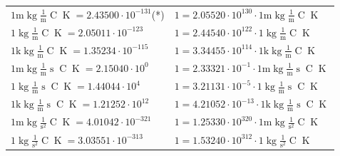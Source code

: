 \begin{center}
\begin{longtable}{l l}
{\color{gray}$1 \bm{\mathrm{ m}}\operatorname{kg}\frac1{\operatorname{m}}{}{\operatorname{C}}{\operatorname{K}} = 2.43500\cdot10^{-131} $}\quad(*) & {\color{gray}$ 1 = 2.05520\cdot10^{130} \cdot 1 \bm{\mathrm{ m}}\operatorname{kg}\frac1{\operatorname{m}}{}{\operatorname{C}}{\operatorname{K}}$}  \\
{\color{black}$1 \bm{\mathrm{ }}\operatorname{kg}\frac1{\operatorname{m}}{}{\operatorname{C}}{\operatorname{K}} = 2.05011\cdot10^{-123} $}   & {\color{black}$ 1 = 2.44540\cdot10^{122} \cdot 1 \bm{\mathrm{ }}\operatorname{kg}\frac1{\operatorname{m}}{}{\operatorname{C}}{\operatorname{K}}$}  \\
{\color{gray}$1 \bm{\mathrm{ k}}\operatorname{kg}\frac1{\operatorname{m}}{}{\operatorname{C}}{\operatorname{K}} = 1.35234\cdot10^{-115} $}   & {\color{gray}$ 1 = 3.34455\cdot10^{114} \cdot 1 \bm{\mathrm{ k}}\operatorname{kg}\frac1{\operatorname{m}}{}{\operatorname{C}}{\operatorname{K}}$}  \\
{\color{gray}$1 \bm{\mathrm{ m}}\operatorname{kg}\frac1{\operatorname{m}}{\operatorname{s}}{\operatorname{C}}{\operatorname{K}} = 2.15040\cdot10^{0} $}   & {\color{gray}$ 1 = 2.33321\cdot10^{-1} \cdot 1 \bm{\mathrm{ m}}\operatorname{kg}\frac1{\operatorname{m}}{\operatorname{s}}{\operatorname{C}}{\operatorname{K}}$}  \\
{\color{black}$1 \bm{\mathrm{ }}\operatorname{kg}\frac1{\operatorname{m}}{\operatorname{s}}{\operatorname{C}}{\operatorname{K}} = 1.44044\cdot10^{4} $}   & {\color{black}$ 1 = 3.21131\cdot10^{-5} \cdot 1 \bm{\mathrm{ }}\operatorname{kg}\frac1{\operatorname{m}}{\operatorname{s}}{\operatorname{C}}{\operatorname{K}}$}  \\
{\color{gray}$1 \bm{\mathrm{ k}}\operatorname{kg}\frac1{\operatorname{m}}{\operatorname{s}}{\operatorname{C}}{\operatorname{K}} = 1.21252\cdot10^{12} $}   & {\color{gray}$ 1 = 4.21052\cdot10^{-13} \cdot 1 \bm{\mathrm{ k}}\operatorname{kg}\frac1{\operatorname{m}}{\operatorname{s}}{\operatorname{C}}{\operatorname{K}}$}  \\
{\color{gray}$1 \bm{\mathrm{ m}}\operatorname{kg}{}\frac1{\operatorname{s}^2}{\operatorname{C}}{\operatorname{K}} = 4.01042\cdot10^{-321} $}   & {\color{gray}$ 1 = 1.25330\cdot10^{320} \cdot 1 \bm{\mathrm{ m}}\operatorname{kg}{}\frac1{\operatorname{s}^2}{\operatorname{C}}{\operatorname{K}}$}  \\
{\color{black}$1 \bm{\mathrm{ }}\operatorname{kg}{}\frac1{\operatorname{s}^2}{\operatorname{C}}{\operatorname{K}} = 3.03551\cdot10^{-313} $}   & {\color{black}$ 1 = 1.53240\cdot10^{312} \cdot 1 \bm{\mathrm{ }}\operatorname{kg}{}\frac1{\operatorname{s}^2}{\operatorname{C}}{\operatorname{K}}$}  \\

\end{longtable}
\end{center}
